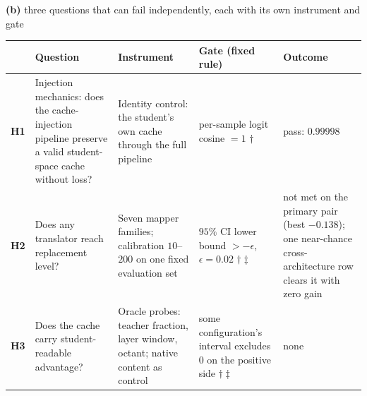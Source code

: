 \vspace{1.6mm}
{\footnotesize\textbf{(b)} three questions that can fail independently,
each with its own instrument and gate\par}
\vspace{1.2mm}
{\footnotesize
\setlength{\tabcolsep}{3pt}%
\begin{tabular}{@{}p{0.62cm}p{2.85cm}p{3.55cm}p{3.05cm}p{2.45cm}@{}}
\toprule
 & \textbf{Question} & \textbf{Instrument} & \textbf{Gate (fixed rule)} & \textbf{Outcome} \\
\midrule
\textbf{H1} & Injection mechanics: does the cache-injection pipeline preserve a
valid student-space cache without loss?
 & Identity control: the student's own cache through the full pipeline
 & per-sample logit cosine $=1$ $\dagger$
 & pass: $0.99998$ \\
\addlinespace[1pt]
\textbf{H2} & Does any translator reach replacement level?
 & Seven mapper families; calibration $10$--$200$ on one fixed evaluation set
 & $95\%$ CI lower bound $>-\epsilon$, $\epsilon{=}0.02$ $\dagger\ddagger$
 & not met on the primary pair (best $-0.138$); one near-chance
 cross-architecture row clears it with zero gain \\
\addlinespace[1pt]
\textbf{H3} & Does the cache carry student-readable advantage?
 & Oracle probes: teacher fraction, layer window, octant; native content as control
 & some configuration's interval excludes $0$ on the positive side $\dagger\ddagger$
 & none \\
\bottomrule
\end{tabular}}
